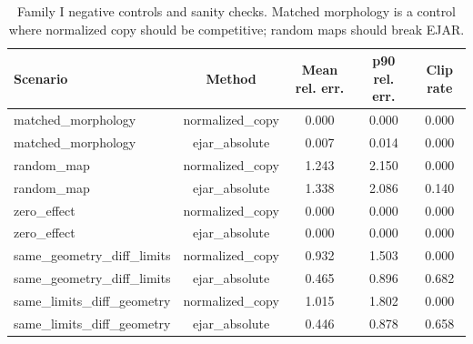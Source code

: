 \begin{table}[t]
\centering
\small
\caption{Family I negative controls and sanity checks. Matched morphology is a control where normalized copy should be competitive; random maps should break EJAR.}
\label{tab:negative-controls}
\begin{tabular}{lcccc}
\toprule
Scenario & Method & Mean rel. err. & p90 rel. err. & Clip rate \\
\midrule
matched\_morphology & normalized\_copy & 0.000 & 0.000 & 0.000 \\
matched\_morphology & ejar\_absolute & 0.007 & 0.014 & 0.000 \\
random\_map & normalized\_copy & 1.243 & 2.150 & 0.000 \\
random\_map & ejar\_absolute & 1.338 & 2.086 & 0.140 \\
zero\_effect & normalized\_copy & 0.000 & 0.000 & 0.000 \\
zero\_effect & ejar\_absolute & 0.000 & 0.000 & 0.000 \\
same\_geometry\_diff\_limits & normalized\_copy & 0.932 & 1.503 & 0.000 \\
same\_geometry\_diff\_limits & ejar\_absolute & 0.465 & 0.896 & 0.682 \\
same\_limits\_diff\_geometry & normalized\_copy & 1.015 & 1.802 & 0.000 \\
same\_limits\_diff\_geometry & ejar\_absolute & 0.446 & 0.878 & 0.658 \\
\bottomrule
\end{tabular}
\end{table}
